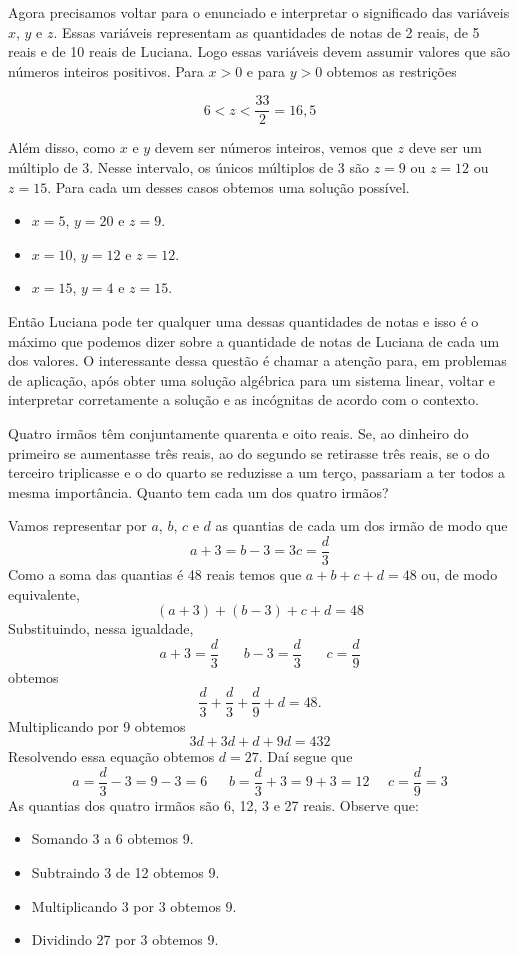 \begin{solution}
Agora precisamos voltar para o enunciado e interpretar o significado das variáveis $x$, $y$ e $z$.
Essas variáveis representam as quantidades de notas de 2 reais, de 5 reais e de 10 reais de Luciana.
Logo essas variáveis devem assumir valores que são números inteiros positivos. Para $x>0$ e para $y>0$ obtemos as restrições

$$6 < z < \dfrac{33}{2}=16,5$$

Além disso, como $x$ e $y$ devem ser números inteiros, vemos que $z$ deve ser um  múltiplo de 3. Nesse intervalo, os únicos múltiplos de 3 são $z=9$ ou $z=12$ ou $z=15$. Para cada um desses casos obtemos uma solução possível.

\begin{itemize}
\item $x=5$, $y=20$ e $z=9$.
\item $x=10$, $y=12$ e $z=12$.
\item $x=15$, $y=4$ e $z=15$.
\end{itemize}

Então Luciana pode ter qualquer uma dessas quantidades de notas e isso é o máximo que podemos dizer sobre a quantidade de notas de Luciana de cada um dos valores. O interessante dessa questão é chamar a atenção para, em problemas de aplicação, após obter uma solução algébrica para um sistema linear, voltar e interpretar corretamente a solução e as incógnitas de acordo com o contexto.
\end{solution}

\begin{problem}
Quatro irmãos têm conjuntamente quarenta e oito reais. Se, ao dinheiro do primeiro se aumentasse três reais, ao do segundo se retirasse três reais, se o do terceiro triplicasse e o do quarto se reduzisse a um terço, passariam a ter todos a mesma importância. Quanto tem cada um dos quatro irmãos?
\end{problem}
\begin{solution}
Vamos representar por $a$, $b$, $c$ e $d$ as quantias de cada um dos irmão de modo que 
$$a+3 = b-3 = 3c = \dfrac{d}{3}$$
Como a soma das quantias é 48 reais temos que $a+b+c+d=48$ ou, de modo equivalente,
$$(a+3) + (b-3) + c + d =48$$
Substituindo, nessa igualdade, 
$$a+3=\dfrac{d}{3}\ \ \ \ \ \ \ \ b-3=\dfrac{d}{3}\ \ \ \ \ \ \ \ c=\dfrac{d}{9}$$
obtemos
$$\dfrac{d}{3} + \dfrac{d}{3} + \dfrac{d}{9} + d =48 .$$
Multiplicando por 9 obtemos
$$3d + 3d + d + 9d =  432$$
Resolvendo essa equação obtemos $d=27$. Daí segue que
$$a = \dfrac{d}{3}-3 = 9-3=6\ \ \ \ \ \ \ b = \dfrac{d}{3}+3 = 9+3=12 \ \ \ \ \ \ c = \dfrac{d}{9} = 3$$
As quantias dos quatro irmãos são 6, 12, 3 e 27 reais. Observe que:
\begin{itemize}
\item Somando 3 a 6 obtemos 9.
\item Subtraindo 3 de 12 obtemos 9.
\item Multiplicando 3 por 3 obtemos 9.
\item Dividindo 27 por 3 obtemos 9.
\end{itemize}
\end{solution}

